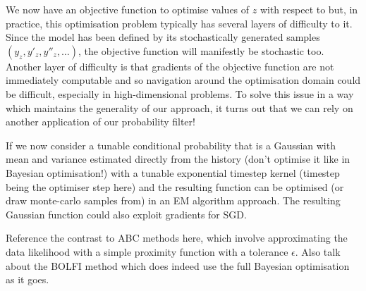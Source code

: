 We now have an objective function to optimise values of $z$ with respect to but, in practice, this optimisation problem typically has several layers of difficulty to it. Since the model has been defined by its stochastically generated samples $(y_z, y'_z, y''_z, \dots)$, the objective function will manifestly be stochastic too. Another layer of difficulty is that gradients of the objective function are not immediately computable and so navigation around the optimisation domain could be difficult, especially in high-dimensional problems. To solve this issue in a way which maintains the generality of our approach, it turns out that we can rely on another application of our probability filter!

If we now consider a tunable conditional probability that is a Gaussian with mean and variance estimated directly from the history (don't optimise it like in Bayesian optimisation!) with a tunable exponential timestep kernel (timestep being the optimiser step here) and the resulting function can be optimised (or draw monte-carlo samples from) in an EM algorithm approach. The resulting Gaussian function could also exploit gradients for SGD.

Reference the contrast to ABC methods here, which involve approximating the data likelihood with a simple proximity function with a tolerance $\epsilon$. Also talk about the BOLFI method which does indeed use the full Bayesian optimisation as it goes.
